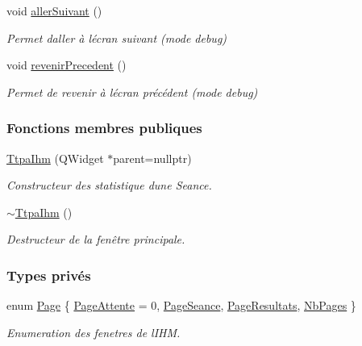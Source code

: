 \begin{DoxyCompactItemize}
void \hyperlink{class_ttpa_ihm_a647bfb1ce10f8ac4b1294a880a76f3d2}{aller\+Suivant} ()
\begin{DoxyCompactList}\small\item\em Permet d\textquotesingle{}aller à l\textquotesingle{}écran suivant (mode debug) \end{DoxyCompactList}\item 
void \hyperlink{class_ttpa_ihm_a92bcffa9388cff7b55a52ae36e5d120d}{revenir\+Precedent} ()
\begin{DoxyCompactList}\small\item\em Permet de revenir à l\textquotesingle{}écran précédent (mode debug) \end{DoxyCompactList}\end{DoxyCompactItemize}
\subsubsection*{Fonctions membres publiques}
\begin{DoxyCompactItemize}
\item 
\hyperlink{class_ttpa_ihm_ab3ed4b37a93ff04842414d4a98861d66}{Ttpa\+Ihm} (Q\+Widget $\ast$parent=nullptr)
\begin{DoxyCompactList}\small\item\em Constructeur des statistique d\textquotesingle{}une Seance. \end{DoxyCompactList}\item 
\hyperlink{class_ttpa_ihm_ae436a774572b54dfa2dac8987fd3bb75}{$\sim$\+Ttpa\+Ihm} ()
\begin{DoxyCompactList}\small\item\em Destructeur de la fenêtre principale. \end{DoxyCompactList}\end{DoxyCompactItemize}
\subsubsection*{Types privés}
\begin{DoxyCompactItemize}
\item 
enum \hyperlink{class_ttpa_ihm_aad886f2c7b90b4f990492092f0be9c2b}{Page} \{ \hyperlink{class_ttpa_ihm_aad886f2c7b90b4f990492092f0be9c2ba94101700630d213692269ca864ff87fe}{Page\+Attente} = 0, 
\hyperlink{class_ttpa_ihm_aad886f2c7b90b4f990492092f0be9c2ba3906edb75bc60b0026a207280c4e41d0}{Page\+Seance}, 
\hyperlink{class_ttpa_ihm_aad886f2c7b90b4f990492092f0be9c2bab8d5cb877cbb72b194dbaf4f834fbc23}{Page\+Resultats}, 
\hyperlink{class_ttpa_ihm_aad886f2c7b90b4f990492092f0be9c2ba66041bd2f2e100691c4d94c918e92956}{Nb\+Pages}
 \}\begin{DoxyCompactList}\small\item\em Enumeration des fenetres de l\textquotesingle{}I\+HM. \end{DoxyCompactList}
\end{DoxyCompactItemize}
